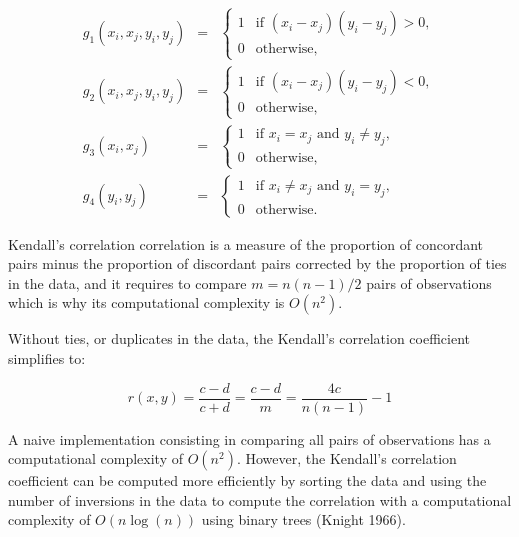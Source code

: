 \documentclass[12pt]{article}
\begin{document}
\begin{eqnarray*}
g_1(x_i, x_j, y_i, y_j) &=& \begin{cases}
  1 & \text{if } (x_i - x_j)(y_i - y_j) > 0, \\
  0 & \text{otherwise},
\end{cases} \\
g_2(x_i, x_j, y_i, y_j) &=& \begin{cases}
  1 & \text{if } (x_i - x_j)(y_i - y_j) < 0, \\
  0 & \text{otherwise},
\end{cases} \\
g_3(x_i, x_j) &=& \begin{cases}
  1 & \text{if } x_i = x_j \text{ and } y_i \neq y_j, \\
  0 & \text{otherwise},
\end{cases} \\
g_4(y_i, y_j) &=& \begin{cases}
  1 & \text{if } x_i \neq x_j \text{ and } y_i = y_j, \\
  0 & \text{otherwise}.
\end{cases}
\end{eqnarray*}

Kendall's correlation correlation is a measure of the proportion of
concordant pairs minus the proportion of discordant pairs corrected by
the proportion of ties in the data, and it requires to compare
\(m = n(n - 1) / 2\) pairs of observations which is why its
computational complexity is \(O(n^2)\).

Without ties, or duplicates in the data, the Kendall's correlation
coefficient simplifies to:

\begin{equation*}
r(x,y) = \frac{c - d}{c + d} = 
 \frac{c - d}{m} =
 \frac{4c}{n(n - 1)} - 1
\end{equation*}

A naive implementation consisting in comparing all pairs of observations
has a computational complexity of \(O(n^2)\). However, the Kendall's
correlation coefficient can be computed more efficiently by sorting the
data and using the number of inversions in the data to compute the
correlation with a computational complexity of \(O(n \log(n))\) using
binary trees (Knight 1966).
\end{document}
